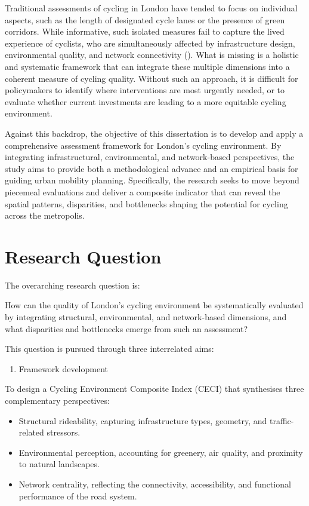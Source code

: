 \documentclass[
  12pt,
  oneside]{book}
\providecommand{\tightlist}{%
  \setlength{\itemsep}{0pt}\setlength{\parskip}{0pt}}
\begin{document}
Traditional assessments of cycling in London have tended to focus on individual aspects, such as the length of designated cycle lanes or the presence of green corridors. While informative, such isolated measures fail to capture the lived experience of cyclists, who are simultaneously affected by infrastructure design, environmental quality, and network connectivity (\textcite{giles-corti_city_2016}). What is missing is a holistic and systematic framework that can integrate these multiple dimensions into a coherent measure of cycling quality. Without such an approach, it is difficult for policymakers to identify where interventions are most urgently needed, or to evaluate whether current investments are leading to a more equitable cycling environment.

Against this backdrop, the objective of this dissertation is to develop and apply a comprehensive assessment framework for London's cycling environment. By integrating infrastructural, environmental, and network-based perspectives, the study aims to provide both a methodological advance and an empirical basis for guiding urban mobility planning. Specifically, the research seeks to move beyond piecemeal evaluations and deliver a composite indicator that can reveal the spatial patterns, disparities, and bottlenecks shaping the potential for cycling across the metropolis.

\section{Research Question}\label{research-question}

The overarching research question is:

How can the quality of London's cycling environment be systematically evaluated by integrating structural, environmental, and network-based dimensions, and what disparities and bottlenecks emerge from such an assessment?

This question is pursued through three interrelated aims:

\begin{enumerate}
\def\labelenumi{\arabic{enumi}.}
\tightlist
\item
  Framework development
\end{enumerate}

To design a Cycling Environment Composite Index (CECI) that synthesises three complementary perspectives:

\begin{itemize}
\tightlist
\item
  Structural rideability, capturing infrastructure types, geometry, and traffic-related stressors.\\
\item
  Environmental perception, accounting for greenery, air quality, and proximity to natural landscapes.\\
\item
  Network centrality, reflecting the connectivity, accessibility, and functional performance of the road system.
\end{itemize}
\end{document}
